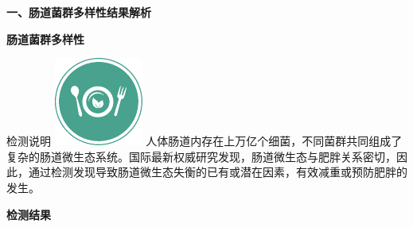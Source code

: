 

\usepackage{graphicx}
\graphicspath{{cores/}}



\vspace*{8mm}
\setlength{\arrayrulewidth}{1pt}
\fontsize{9.3pt}{11pt}\selectfont
\color{gray2}
\begin{center}
{\noindent\bf\sanhao 一、肠道菌群多样性结果解析}
\end{center}

\vspace*{6mm}
{\noindent\bf\wuhao 肠道菌群多样性}

\begin{LRaside}[.8]{检测说明}
\noindent
\includegraphics[width=\linewidth]{yingyanggongneng.pdf}
\asidebreak %
人体肠道内存在上万亿个细菌，不同菌群共同组成了复杂的肠道微生态系统。国际最新权威研究发现，肠道微生态与肥胖关系密切，因此，通过检测发现导致肠道微生态失衡的已有或潜在因素，有效减重或预防肥胖的发生。
\end{LRaside}
\smallskip
{\noindent\bf\wuhao 检测结果}
\vspace*{-5mm}
